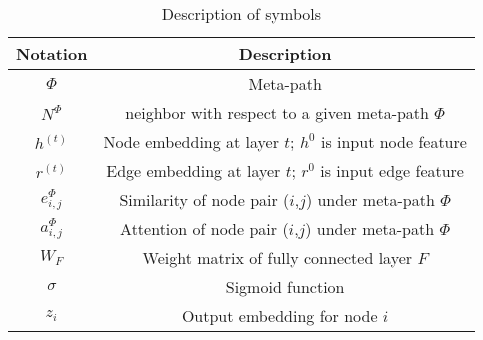 \begin{table}[]
\caption{Description of symbols}
\centering
\begin{tabular}{cc}
\hline
Notation       & Description                                                       \\ \hline
$\Phi$         & Meta-path                                                         \\
$N^\Phi$       & neighbor with respect to a given meta-path $\Phi$          \\
$h^{(t)}$        & Node embedding at layer $t$; $h^0$ is input node feature \\
$r^{(t)}$        & Edge embedding at layer $t$; $r^0$ is input edge feature \\
$e_{i,j}^\Phi$ & Similarity of node pair ($i$,$j$) under meta-path $\Phi$   \\
$a_{i,j}^\Phi$ & Attention of node pair ($i$,$j$) under meta-path $\Phi$    \\
$W_F$          & Weight matrix of fully connected layer $F$          \\
$\sigma$       & Sigmoid function                                                  \\
$z_i$            & Output embedding for node $i$                                     \\
\hline
\end{tabular}
\label{table:notation}
\end{table}











